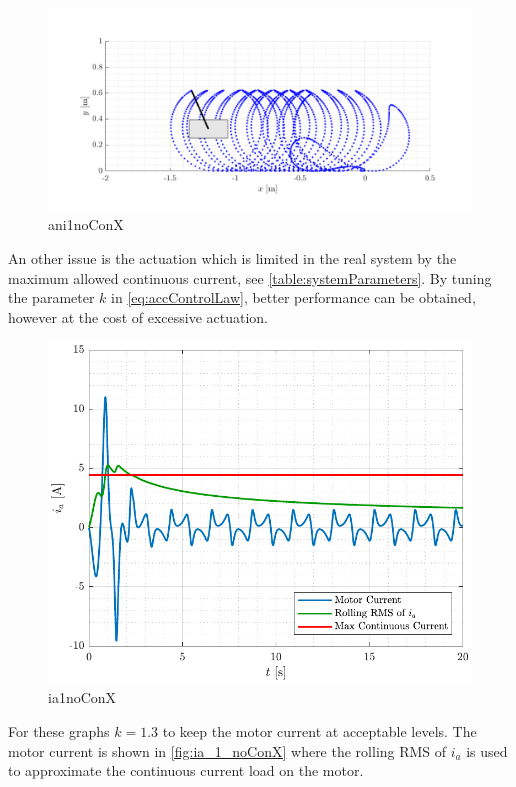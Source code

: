 \begin{figure}[H]
  \includegraphics[width=.7\textwidth]{figures/ani_1_noConX}
  \caption{ani1noConX}
  \label{fig:ani_1_noConX}
\end{figure}
%
An other issue is the actuation which is limited in the real system by the maximum allowed continuous current, see \autoref{table:systemParameters}. By tuning the parameter $k$ in \autoref{eq:accControlLaw}, better performance can be obtained, however at the cost of excessive actuation.
%
\begin{figure}[H]
  \includegraphics[width=.52\textwidth]{figures/ia_1_noConX}
  \caption{ia1noConX}
  \label{fig:ia_1_noConX}
\end{figure}
%
For these graphs $k=1.3$ to keep the motor current at acceptable levels. The motor current is shown in \autoref{fig:ia_1_noConX} where the rolling RMS of $i_a$ is used to approximate the continuous current load on the motor.



